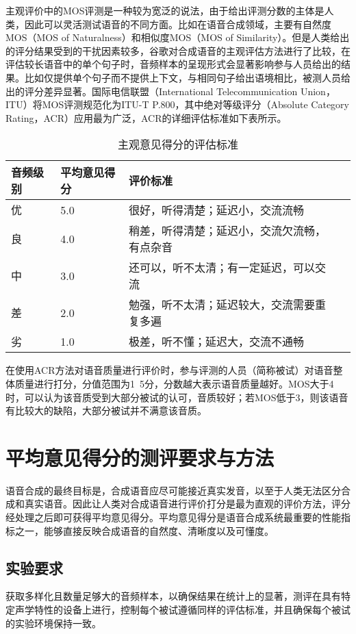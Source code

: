 \documentclass[cn,10pt,math=newtx,citestyle=gb7714-2015,bibstyle=gb7714-2015]{elegantbook}
\begin{document}
主观评价中的MOS评测是一种较为宽泛的说法，由于给出评测分数的主体是人类，因此可以灵活测试语音的不同方面。比如在语音合成领域，主要有自然度MOS（MOS of Naturalness）和相似度MOS（MOS of Similarity）。但是人类给出的评分结果受到的干扰因素较多，谷歌对合成语音的主观评估方法进行了比较，在评估较长语音中的单个句子时，音频样本的呈现形式会显著影响参与人员给出的结果。比如仅提供单个句子而不提供上下文，与相同句子给出语境相比，被测人员给出的评分差异显著。国际电信联盟（International Telecommunication Union，ITU）将MOS评测规范化为ITU-T P.800，其中绝对等级评分（Absolute Category Rating，ACR）应用最为广泛，ACR的详细评估标准如下表所示。

\begin{table}[htbp]
  \centering
  \caption{主观意见得分的评估标准}
    \begin{tabular}{llll}
    \toprule
    音频级别 & 平均意见得分 & 评价标准 \\
    \midrule
    优 & 5.0 & 很好，听得清楚；延迟小，交流流畅 \\
    良 & 4.0 & 稍差，听得清楚；延迟小，交流欠流畅，有点杂音 \\
    中 & 3.0 & 还可以，听不太清；有一定延迟，可以交流 \\
    差 & 2.0 & 勉强，听不太清；延迟较大，交流需要重复多遍 \\
    劣 & 1.0 & 极差，听不懂；延迟大，交流不通畅 \\
    \bottomrule
    \end{tabular}%
\end{table}%

在使用ACR方法对语音质量进行评价时，参与评测的人员（简称被试）对语音整体质量进行打分，分值范围为1~5分，分数越大表示语音质量越好。MOS大于4时，可以认为该音质受到大部分被试的认可，音质较好；若MOS低于3，则该语音有比较大的缺陷，大部分被试并不满意该音质。

\section{平均意见得分的测评要求与方法}
语音合成的最终目标是，合成语音应尽可能接近真实发音，以至于人类无法区分合成和真实语音。因此让人类对合成语音进行评价打分是最为直观的评价方法，评分经处理之后即可获得平均意见得分。平均意见得分是语音合成系统最重要的性能指标之一，能够直接反映合成语音的自然度、清晰度以及可懂度。
\subsection{实验要求}
获取多样化且数量足够大的音频样本，以确保结果在统计上的显著，测评在具有特定声学特性的设备上进行，控制每个被试遵循同样的评估标准，并且确保每个被试的实验环境保持一致。
\end{document}
